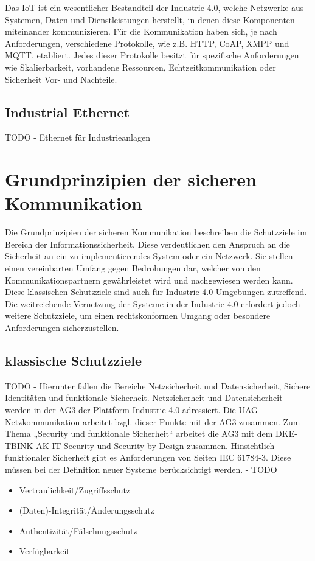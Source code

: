Das \ac{IoT} ist ein wesentlicher Bestandteil der Industrie 4.0, welche Netzwerke aus Systemen, Daten und Dienstleistungen herstellt, in denen diese Komponenten miteinander kommunizieren. Für die Kommunikation haben sich, je nach Anforderungen, verschiedene Protokolle, wie z.B. \ac{HTTP}, \ac{CoAP}, \ac{XMPP} und \ac{MQTT}, etabliert. Jedes dieser Protokolle besitzt für spezifische Anforderungen wie Skalierbarkeit, vorhandene Ressourcen, Echtzeitkommunikation oder Sicherheit Vor- und Nachteile. 

\subsection{Industrial Ethernet}
TODO - Ethernet für Industrieanlagen

\section{Grundprinzipien der sicheren Kommunikation}
\label{Grundlagen:Grundprinzipien der sicheren Kommunikation}
Die Grundprinzipien der sicheren Kommunikation beschreiben die Schutzziele im Bereich der Informationssicherheit. Diese verdeutlichen den Anspruch an die Sicherheit an ein zu implementierendes System oder ein Netzwerk. Sie stellen einen vereinbarten Umfang gegen Bedrohungen dar, welcher von den Kommunikationspartnern gewährleistet wird und nachgewiesen werden kann. Diese klassischen Schutzziele sind auch für Industrie 4.0 Umgebungen zutreffend. Die weitreichende Vernetzung der Systeme in der Industrie 4.0 erfordert jedoch weitere Schutzziele, um einen rechtskonformen Umgang oder besondere Anforderungen sicherzustellen.

\subsection{klassische Schutzziele}
TODO - Hierunter fallen die Bereiche Netzsicherheit und Datensicherheit, Sichere Identitäten und funktionale Sicherheit. Netzsicherheit und Datensicherheit werden in der AG3 der Plattform Industrie 4.0 adressiert. Die UAG Netzkommunikation arbeitet bzgl. dieser Punkte mit der AG3 zusammen. Zum Thema „Security und funktionale Sicherheit“ arbeitet die AG3 mit dem DKE-TBINK AK IT Security und Security by Design zusammen. Hinsichtlich funktionaler Sicherheit gibt es Anforderungen von Seiten IEC 61784-3. Diese müssen bei der Definition neuer Systeme berücksichtigt werden. - TODO

\begin{itemize}
  \item Vertraulichkeit/Zugriffsschutz
  \item (Daten)-Integrität/Änderungsschutz
  \item Authentizität/Fälschungsschutz
  \item Verfügbarkeit
\end{itemize}

